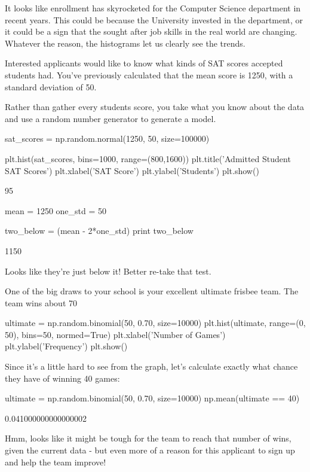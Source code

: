 \documentclass{journal}
\begin{document}
It looks like enrollment has skyrocketed for the Computer Science department in recent years. This could be because the University invested in the department, or it could be a sign that the sought after job skills in the real world are changing. Whatever the reason, the histograms let us clearly see the trends.

Interested applicants would like to know what kinds of SAT scores accepted students had. You've previously calculated that the mean score is 1250, with a standard deviation of 50.

Rather than gather every students score, you take what you know about the data and use a random number generator to generate a model.

sat_scores = np.random.normal(1250, 50, size=100000)

plt.hist(sat_scores, bins=1000, range=(800,1600))
plt.title('Admitted Student SAT Scores')
plt.xlabel('SAT Score')
plt.ylabel('Students')
plt.show()

95%

mean = 1250
one_std = 50

two_below = (mean - 2*one_std)
print two_below

1150

Looks like they're just below it! Better re-take that test.

One of the big draws to your school is your excellent ultimate frisbee team. The team wins about 70%

ultimate = np.random.binomial(50, 0.70, size=10000)
plt.hist(ultimate, range=(0, 50), bins=50, normed=True)
plt.xlabel('Number of Games')
plt.ylabel('Frequency')
plt.show()

Since it's a little hard to see from the graph, let's calculate exactly what chance they have of winning 40 games:

ultimate = np.random.binomial(50, 0.70, size=10000)
np.mean(ultimate == 40)

0.041000000000000002

Hmm, looks like it might be tough for the team to reach that number of wins, given the current data - but even more of a reason for this applicant to sign up and help the team improve!
\end{document}
